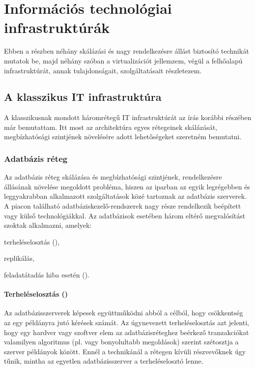 \chapter{Információs technológiai infrastruktúrák}

Ebben a részben néhány skálázási és nagy rendelkezésre állást biztosító technikát mutatok be, majd néhány szóban a virtualizációt jellemzem, végül a felhőalapú infrastruktúrát, annak tulajdonságait, szolgáltatásait részletezem.

\section{A klasszikus IT infrastruktúra}
A klasszikusnak mondott háromrétegű IT infrastruktúrát az írás korábbi részében már bemutattam. Itt most az architektúra egyes rétegeinek skálázását, megbízhatósági szintjének növelésére adott lehetőségeket szeretném bemutatni.
\subsection{Adatbázis réteg}
Az adatbázis réteg skálázása és megbízhatósági szintjének, rendelkezésre állásának növelése megoldott probléma, hiszen az iparban az egyik legrégebben és leggyakrabban alkalmazott szolgáltatások közé tartoznak az adatbázis szerverek. A piacon található adatbáziskezelő-rendszerek nagy része rendelkezik beépített vagy külső technológiákkal.
Az adatbázisok esetében három eltérő megvalósítást szoktak alkalmazni, amelyek\cite{mizofr}:
\begin{sajat_itemize}
\item terheléselosztás (),
\item replikálás,
\item feladatátadás hiba esetén ().
\end{sajat_itemize}

\subsubsection{Terheléselosztás ()}

Az adatbázisszerverek képesek együttműködni abból a célból, hogy csökkentség az egy példányra jutó kérések számát. Az úgynevezett terheléselosztás azt jelenti, hogy egy hardver vagy szoftver elem az adatbázisréteghez beérkező tranzakciókat valamilyen algoritmus (pl.  vagy bonyolultabb megoldások) szerint szétosztja a szerver példányok között. Ennél a technikánál a rétegen kívüli részvevőknek úgy tűnik, mintha az egyetlen adatbázisszerver a terheléselosztó lenne.

